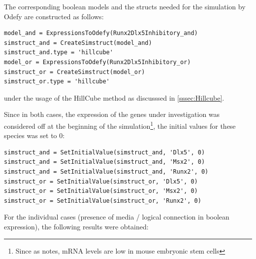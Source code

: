 \documentclass[11pt]{article}
\begin{document}
The corresponding boolean models and the structs needed for the simulation by Odefy are constructed as follows:
\begin{lstlisting}
model_and = ExpressionsToOdefy(Runx2Dlx5Inhibitory_and)
simstruct_and = CreateSimstruct(model_and)
simstruct_and.type = 'hillcube'
model_or = ExpressionsToOdefy(Runx2Dlx5Inhibitory_or)
simstruct_or = CreateSimstruct(model_or)
simstruct_or.type = 'hillcube'
\end{lstlisting}
under the usage of the HillCube method as discusssed in \ref{sssec:Hillcube}.

Since in both cases, the expression of the genes under investigation was considered off at the beginning of the simulation\footnote{Since as \cite{Kirkham} notes, mRNA levels are low in mouse embryonic stem cells}, the initial values for these species was set to 0:
\begin{lstlisting}
simstruct_and = SetInitialValue(simstruct_and, 'Dlx5', 0)
simstruct_and = SetInitialValue(simstruct_and, 'Msx2', 0)
simstruct_and = SetInitialValue(simstruct_and, 'Runx2', 0)
simstruct_or = SetInitialValue(simstruct_or, 'Dlx5', 0)
simstruct_or = SetInitialValue(simstruct_or, 'Msx2', 0)
simstruct_or = SetInitialValue(simstruct_or, 'Runx2', 0)
\end{lstlisting}

For the individual cases (presence of media / logical connection in boolean expression), the following results were obtained:
\end{document}
